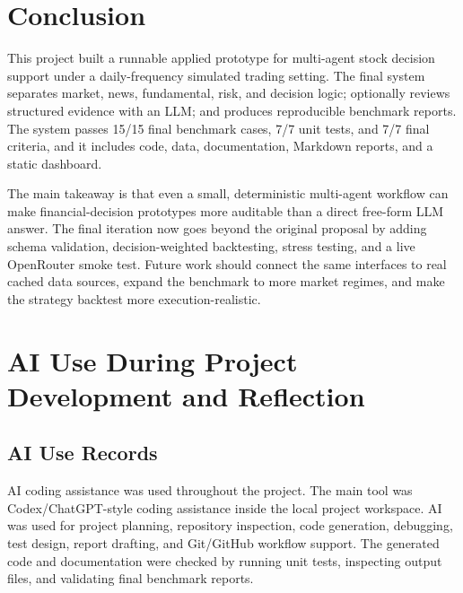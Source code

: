 \documentclass{article}
\begin{document}
\section{Conclusion}

This project built a runnable applied prototype for multi-agent stock decision support under a daily-frequency simulated trading setting. The final system separates market, news, fundamental, risk, and decision logic; optionally reviews structured evidence with an LLM; and produces reproducible benchmark reports. The system passes 15/15 final benchmark cases, 7/7 unit tests, and 7/7 final criteria, and it includes code, data, documentation, Markdown reports, and a static dashboard.

The main takeaway is that even a small, deterministic multi-agent workflow can make financial-decision prototypes more auditable than a direct free-form LLM answer. The final iteration now goes beyond the original proposal by adding schema validation, decision-weighted backtesting, stress testing, and a live OpenRouter smoke test. Future work should connect the same interfaces to real cached data sources, expand the benchmark to more market regimes, and make the strategy backtest more execution-realistic.




\clearpage
\appendix
\section{AI Use During Project Development and Reflection}
\label{app:ai-use}

\subsection{AI Use Records}

AI coding assistance was used throughout the project. The main tool was Codex/ChatGPT-style coding assistance inside the local project workspace. AI was used for project planning, repository inspection, code generation, debugging, test design, report drafting, and Git/GitHub workflow support. The generated code and documentation were checked by running unit tests, inspecting output files, and validating final benchmark reports.
\end{document}
